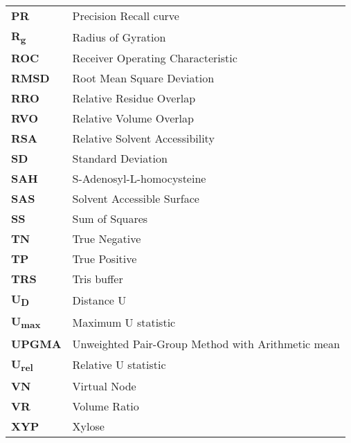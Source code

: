 \begin{longtable}[l]{@{}p{2.5cm}p{12cm}@{}}
\textbf{PR} & Precision Recall curve \\
\textbf{R\textsubscript{g}} & Radius of Gyration \\
\textbf{ROC} & Receiver Operating Characteristic \\
\textbf{RMSD} & Root Mean Square Deviation \\
\textbf{RRO} & Relative Residue Overlap \\
\textbf{RVO} & Relative Volume Overlap \\
\textbf{RSA} & Relative Solvent Accessibility \\
\textbf{SD} & Standard Deviation \\
\textbf{SAH} & S-Adenosyl-L-homocysteine \\
\textbf{SAS} & Solvent Accessible Surface \\
\textbf{SS} & Sum of Squares \\
\textbf{TN} & True Negative \\
\textbf{TP} & True Positive \\
\textbf{TRS} & Tris buffer \\
\textbf{U\textsubscript{D}} & Distance U \\
\textbf{U\textsubscript{max}} & Maximum U statistic \\
\textbf{UPGMA} & Unweighted Pair-Group Method with Arithmetic mean \\
\textbf{U\textsubscript{rel}} & Relative U statistic \\
\textbf{VN} & Virtual Node \\
\textbf{VR} & Volume Ratio \\
\textbf{XYP} & Xylose \\

\end{longtable}
